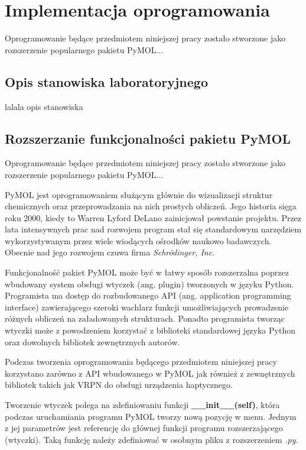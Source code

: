 \documentclass[licencjacka]{pracamgr}
\begin{document}
\chapter{Implementacja oprogramowania}

Oprogramowanie będące przedmiotem niniejszej pracy zostało stworzone jako rozszerzenie popularnego pakietu PyMOL...

\section{Opis stanowiska laboratoryjnego}
lalala opis stanowiska

\section{Rozszerzanie funkcjonalności pakietu PyMOL}

Oprogramowanie będące przedmiotem niniejszej pracy zostało stworzone jako rozszerzenie popularnego pakietu PyMOL...


PyMOL jest oprogramowaniem służącym głównie do wizualizacji struktur chemicznych oraz przeprowadzania na nich prostych obliczeń. Jego historia sięga roku 2000, kiedy to Warren Lyford DeLano zainicjował powstanie projektu. Przez lata intensywnych prac nad rozwojem program stał się standardowym narzędziem wykorzystywanym przez wiele wiodących ośrodków naukowo badawczych. Obecnie nad jego rozwojem czuwa firma \textit{Schrödinger, Inc}.

Funkcjonalność pakiet PyMOL może być w łatwy sposób rozszerzalna poprzez wbudowany system obsługi wtyczek (ang. plugin) tworzonych w języku Python. Programista ma dostęp do rozbudowanego API (ang. application programming interface) zawierającego szeroki wachlarz funkcji umożliwiających prowadzenie różnych obliczeń na załadowanych strukturach. Ponadto programista tworząc wtyczki może z powodzeniem korzystać z biblioteki standardowej języka Python oraz dowolnych bibliotek zewnętrznych autorów.

Podczas tworzenia oprogramowania będącego przedmiotem niniejszej pracy korzystano zarówno z API wbudowanego w PyMOL jak również z zewnętrznych bibliotek takich jak VRPN do obsługi urządzenia haptycznego.

Tworzenie wtyczek polega na zdefiniowaniu funkcji \textbf{\_\_init\_\_(self)}, która podczas uruchamiania programu PyMOL tworzy nową pozycję w menu. Jednym z jej parametrów jest referencję do głównej funkcji programu rozszerzającego (wtyczki). Taką funkcję należy zdefiniować w osobnym pliku z rozszerzeniem \textit{.py}.
\end{document}
